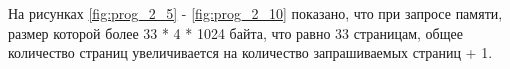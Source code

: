 \begin{figure}[ht!]
\end{figure}

\newpage






На рисунках \ref{fig:prog_2_5} - \ref{fig:prog_2_10} показано, что при запросе памяти, 
размер которой более 33 * 4 * 1024 байта, что равно 33 страницам, общее количество страниц 
увеличивается на количество запрашиваемых страниц + 1.

\begin{figure}[ht!]
\end{figure}


\begin{figure}[ht!]
\end{figure}

